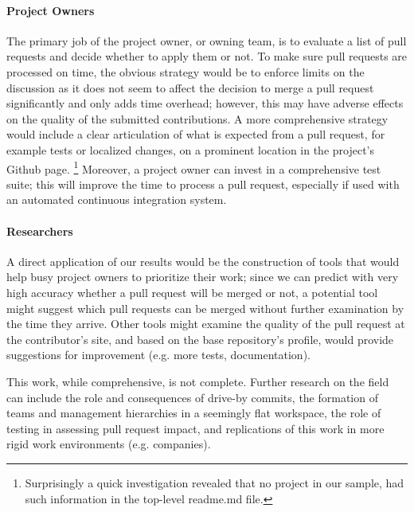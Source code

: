 \documentclass{sig-alternate}
\begin{document}
\paragraph{Project Owners} The primary job of the project owner, or owning team,
is to evaluate a list of pull requests and decide whether to apply them or not.
To make sure pull requests are processed on time, the obvious strategy would be
to enforce limits on the discussion as it does not seem to affect the decision
to merge a pull request significantly and only adds time overhead; however, this
may have adverse effects on the quality of the submitted contributions. A more
comprehensive strategy would include a clear articulation of what is expected
from a pull request, for example tests or localized changes, on a prominent
location in the project's Github page.  \footnote{Surprisingly a quick
investigation revealed that no project in our sample, had such information in
the top-level {\sc readme}.md file.} Moreover, a project owner can invest in a
comprehensive test suite; this will improve the time to process a pull request,
especially if used with an automated continuous integration system.


\paragraph{Researchers}

A direct application of our results would be the construction of tools that
would help busy project owners to prioritize their work; since we can predict
with very high accuracy whether a pull request will be merged or not, a
potential tool might suggest which pull requests can be merged without further
examination by the time they arrive. Other tools might examine the quality of
the pull request at the contributor's site, and based on the base repository's
profile, would provide suggestions for improvement (e.g. more tests,
documentation). 

This work, while comprehensive, is not complete. Further research
on the field can include the role and consequences of drive-by commits, 
the formation of teams and management hierarchies in a seemingly flat
workspace, the role of testing in assessing pull request impact,
and replications
of this work in more rigid work environments (e.g. companies).
\end{document}
